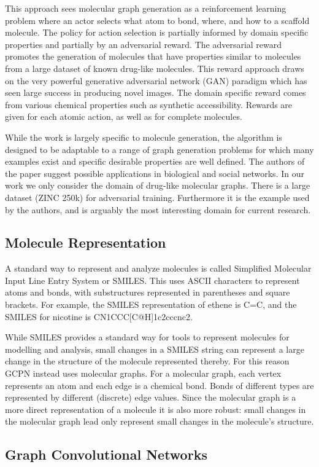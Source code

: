 \documentclass{article}
\begin{document}
This approach sees molecular graph generation as a reinforcement learning problem where an actor selects what atom to bond, where, and how to a scaffold molecule. The policy for action selection is partially informed by domain specific properties and partially by an adversarial reward. The adversarial reward promotes the generation of molecules that have properties similar to molecules from a large dataset of known drug-like molecules. This reward approach draws on the very powerful generative adversarial network (GAN) paradigm which has seen large success in producing novel images. The domain specific reward comes from various chemical properties such as synthetic accessibility. Rewards are given for each atomic action, as well as for complete molecules.

While the work is largely specific to molecule generation, the algorithm is designed to be adaptable to a range of graph generation problems for which many examples exist and specific desirable properties are well defined. The authors of the paper suggest possible applications in biological and social networks.
In our work we only consider the domain of drug-like molecular graphs. There is a large dataset (ZINC 250k) for adversarial training. Furthermore it is the example used by the authors, and is arguably the most interesting domain for current research.
\subsection{Molecule Representation}
A standard way to represent and analyze molecules is called Simplified Molecular Input Line Entry System or SMILES. This uses ASCII characters to represent atoms and bonds, with substructures represented in parentheses and square brackets. For example, the SMILES representation of ethene is C=C, and the SMILES for nicotine is CN1CCC[C@H]1c2cccnc2.

While SMILES provides a standard way for tools to represent molecules for modelling and analysis, small changes in a SMILES string can represent a large change in the structure of the molecule represented thereby. For this reason GCPN instead uses molecular graphs. For a molecular graph, each vertex represents an atom and each edge is a chemical bond. Bonds of different types are represented by different (discrete) edge values. Since the molecular graph is a more direct representation of a molecule it is also more robust: small changes in the molecular graph lead only represent small changes in the molecule's structure.
\subsection{Graph Convolutional Networks}
\end{document}
